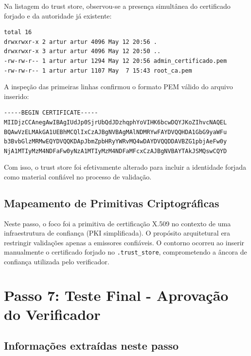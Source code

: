 \documentclass[12pt,a4paper]{article}
\begin{document}
Na listagem do trust store, observou-se a presença simultânea do certificado forjado e da autoridade já existente:

\begin{lstlisting}
total 16
drwxrwxr-x 2 artur artur 4096 May 12 20:56 .
drwxrwxr-x 3 artur artur 4096 May 12 20:50 ..
-rw-rw-r-- 1 artur artur 1294 May 12 20:56 admin_certificado.pem
-rw-rw-r-- 1 artur artur 1107 May  7 15:43 root_ca.pem
\end{lstlisting}

A inspeção das primeiras linhas confirmou o formato PEM válido do arquivo inserido:

\begin{lstlisting}
-----BEGIN CERTIFICATE-----
MIIDjzCCAnegAwIBAgIUdJp0SjrUbQdJDzhqphYoVIHK6bcwDQYJKoZIhvcNAQEL
BQAwVzELMAkGA1UEBhMCQlIxCzAJBgNVBAgMAlNDMRYwFAYDVQQHDA1GbG9yaWFu
b3BvbGlzMRMwEQYDVQQKDApJbmZpbHRyYWRvMQ4wDAYDVQQDDAVBZG1pbjAeFw0y
NjA1MTIyMzM4NDFaFw0yNzA1MTIyMzM4NDFaMFcxCzAJBgNVBAYTAkJSMQswCQYD
\end{lstlisting}

Com isso, o trust store foi efetivamente alterado para incluir a identidade forjada como material confiável no processo de validação.

\subsection{Mapeamento de Primitivas Criptográficas}

Neste passo, o foco foi a primitiva de certificação X.509 no contexto de uma infraestrutura de confiança (PKI simplificada).
O propósito arquitetural era restringir validações apenas a emissores confiáveis.
O contorno ocorreu ao inserir manualmente o certificado forjado no \texttt{.trust\_store}, comprometendo a âncora de confiança utilizada pelo verificador.



\section{Passo 7: Teste Final - Aprovação do Verificador}

\subsection{Informações extraídas neste passo}
\end{document}
